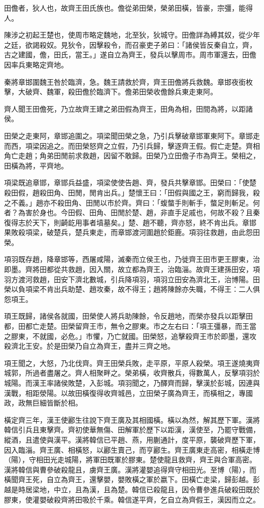 
\begin{pinyinscope}
田儋者，狄人也，故齊王田氏族也。儋從弟田榮，榮弟田橫，皆豪，宗彊，能得人。

陳涉之初起王楚也，使周市略定魏地，北至狄，狄城守。田儋詳為縛其奴，從少年之廷，欲謁殺奴。見狄令，因擊殺令，而召豪吏子弟曰：「諸侯皆反秦自立，齊，古之建國，儋，田氏，當王。」遂自立為齊王，發兵以擊周市。周市軍還去，田儋因率兵東略定齊地。

秦將章邯圍魏王咎於臨濟，急。魏王請救於齊，齊王田儋將兵救魏。章邯夜銜枚擊，大破齊、魏軍，殺田儋於臨濟下。儋弟田榮收儋餘兵東走東阿。

齊人聞王田儋死，乃立故齊王建之弟田假為齊王，田角為相，田間為將，以距諸侯。

田榮之走東阿，章邯追圍之。項梁聞田榮之急，乃引兵擊破章邯軍東阿下。章邯走而西，項梁因追之。而田榮怒齊之立假，乃引兵歸，擊逐齊王假。假亡走楚。齊相角亡走趙；角弟田閒前求救趙，因留不敢歸。田榮乃立田儋子市為齊王。榮相之，田橫為將，平齊地。

項梁既追章邯，章邯兵益盛，項梁使使告趙、齊，發兵共擊章邯。田榮曰：「使楚殺田假，趙殺田角、田閒，閒肯出兵。」楚懷王曰：「田假與國之王，窮而歸我，殺之不義。」趙亦不殺田角、田閒以市於齊。齊曰：「蝮螫手則斬手，螫足則斬足。何者？為害於身也。今田假、田角、田閒於楚、趙，非直手足戚也，何故不殺？且秦復得志於天下，則齮龁用事者墳墓矣。」楚、趙不聽，齊亦怒，終不肯出兵。章邯果敗殺項梁，破楚兵，楚兵東走，而章邯渡河圍趙於鉅鹿。項羽往救趙，由此怨田榮。

項羽既存趙，降章邯等，西屠咸陽，滅秦而立侯王也，乃徙齊王田市更王膠東，治即墨。齊將田都從共救趙，因入關，故立都為齊王，治臨淄。故齊王建孫田安，項羽方渡河救趙，田安下濟北數城，引兵降項羽，項羽立田安為濟北王，治博陽。田榮以負項梁不肯出兵助楚、趙攻秦，故不得王；趙將陳餘亦失職，不得王：二人俱怨項王。

頊王既歸，諸侯各就國，田榮使人將兵助陳餘，令反趙地，而榮亦發兵以距擊田都，田都亡走楚。田榮留齊王市，無令之膠東。市之左右曰：「項王彊暴，而王當之膠東，不就國，必危。」市懼，乃亡就國。田榮怒，追擊殺齊王市於即墨，還攻殺濟北王安。於是田榮乃自立為齊王，盡并三齊之地。

項王聞之，大怒，乃北伐齊。齊王田榮兵敗，走平原，平原人殺榮。項王遂燒夷齊城郭，所過者盡屠之。齊人相聚畔之。榮弟橫，收齊散兵，得數萬人，反擊項羽於城陽。而漢王率諸侯敗楚，入彭城。項羽聞之，乃醳齊而歸，擊漢於彭城，因連與漢戰，相距滎陽。以故田橫復得收齊城邑，立田榮子廣為齊王，而橫相之，專國政，政無巨細皆斷於相。

橫定齊三年，漢王使酈生往說下齊王廣及其相國橫。橫以為然，解其歷下軍。漢將韓信引兵且東擊齊。齊初使華無傷、田解軍於歷下以距漢，漢使至，乃罷守戰備，縱酒，且遣使與漢平。漢將韓信已平趙、燕，用蒯通計，度平原，襲破齊歷下軍，因入臨淄。齊王廣、相橫怒，以酈生賣己，而亨酈生。齊王廣東走高密，相橫走博（陽），守相田光走城陽，將軍田既軍於膠東。楚使龍且救齊，齊王與合軍高密。漢將韓信與曹參破殺龍且，虜齊王廣。漢將灌嬰追得齊守相田光。至博（陽），而橫聞齊王死，自立為齊王，還擊嬰，嬰敗橫之軍於嬴下。田橫亡走梁，歸彭越。彭越是時居梁地，中立，且為漢，且為楚。韓信已殺龍且，因令曹參進兵破殺田既於膠東，使灌嬰破殺齊將田吸於千乘。韓信遂平齊，乞自立為齊假王，漢因而立之。


\end{pinyinscope}

